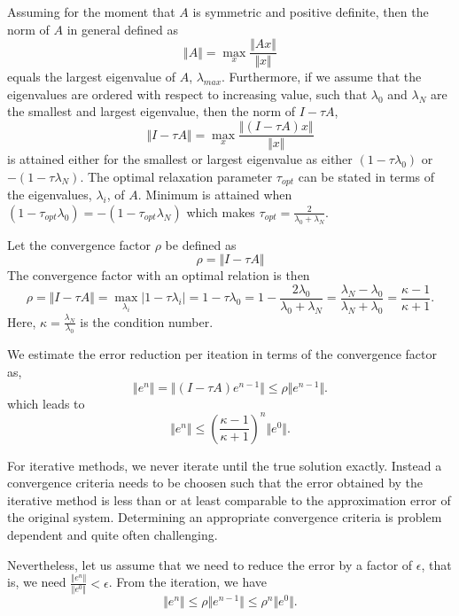 Assuming for the moment that $A$ is symmetric and positive definite, then  
the norm of $A$ in general defined as 
\[
\Vert A\Vert = \max_x \frac{\Vert Ax \Vert}{\Vert x \Vert} 
\]
equals the largest eigenvalue of $A$, $\lambda_{max}$.   
Furthermore, if we assume that the eigenvalues are ordered with respect to increasing value,
such that  $\lambda_0$ and $\lambda_N$ are the smallest and largest eigenvalue, then the
norm of $I - \tau A $, 
\[
\Vert I - \tau A\Vert = \max_x \frac{\Vert (I - \tau A) x \Vert}{\Vert x \Vert} 
\]
is attained either for the smallest or largest eigenvalue as either   
$(1 - \tau \lambda_0)$ or  $-(1 - \tau \lambda_N)$.  
The optimal relaxation parameter $\tau_{opt}$ can be stated in terms of the eigenvalues,    $\lambda_i$,  of $A$. 
Minimum is attained
when $(1 - \tau_{opt} \lambda_0) = -(1 - \tau_{opt} \lambda_N)$ which makes   
$\tau_{opt} = \frac{2}{\lambda_0 + \lambda_N}$.

Let the convergence factor $\rho$ be defined as 
\[
\rho = \Vert I - \tau A\Vert 
\]
The convergence factor with an optimal relation is then 
\[
\rho = \Vert I - \tau A\Vert = \max_{\lambda_i}\vert 1- \tau \lambda_i\vert  = 
1 - \tau\lambda_0 = 1 - \frac{2\lambda_0}{\lambda_0 + \lambda_N} = 
\frac{\lambda_N - \lambda_0}{\lambda_N + \lambda_0} = \frac{\kappa - 1}{\kappa + 1}.
\]  
Here, $\kappa=\frac{\lambda_N}{\lambda_0}$ is the condition number. 

We estimate the error reduction per iteation in terms of the convergence factor as, 
\[
\Vert e^n \Vert = \Vert (I - \tau A) e^{n-1} \Vert \le  \rho \Vert e^{n-1}\Vert .  
\]
which leads to
\[
\Vert e^n \Vert \leqslant (\frac{\kappa - 1}{\kappa + 1})^n\Vert e^0\Vert. 
\]


For iterative methods, we never iterate until the true solution exactly. Instead a convergence 
criteria needs to be choosen such that the error obtained by the iterative method is
less than or at least comparable to the approximation error of the original system.      
Determining an appropriate convergence criteria is problem dependent and quite often 
challenging. 

Nevertheless, let us assume  that we need to reduce the error by a factor of $\epsilon$, 
that is, we need $\frac{\Vert e^n\Vert}{\Vert e^0 \Vert} < \epsilon$. From the iteration, we have 
\begin{equation}
\label{eq:convergence}
\Vert e^n \Vert \leqslant \rho \Vert e^{n-1} \Vert \leqslant \rho^n \Vert e^0 \Vert.
\end{equation}

